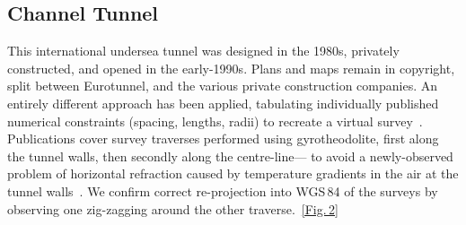 \documentclass[conference,a4paper]{IEEEtran}
\begin{document}
\subsection{Channel Tunnel}%
\vspace{-0.112em}

This international undersea tunnel was designed in the 1980s,
privately constructed, and opened in the early-1990s.  Plans and maps
remain in copyright, split between Eurotunnel, and the various private
construction companies.  An entirely different approach has
been applied, tabulating individually published numerical
constraints (spacing, lengths, radii) to recreate a virtual survey~\cite{osm-wiki-chunnel,sladen-sotm2013}.
Publications cover
survey traverses performed using gyrotheodolite, first along the tunnel walls, then secondly along the centre-line---%
to avoid a newly-observed problem of horizontal
refraction caused by temperature gradients in the air at the tunnel walls~\cite{korittke-1997,korittke-1989}.
We confirm correct re-projection into WGS\,84 of the surveys by observing
one zig-zagging around the other traverse.~\hfill\hyperref[fig:osm-chunnel-traverse]{[Fig.\,2]}\par\vspace*{\fill}
\end{document}
